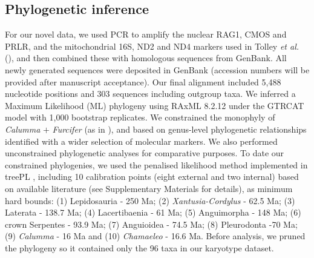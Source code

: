 \documentclass[a4paper, 12pt]{article}
\begin{document}
\subsection{Phylogenetic inference}
For our novel data, we used PCR to amplify the nuclear RAG1, CMOS and PRLR, and the mitochondrial 16S, ND2 and ND4 markers used in Tolley \textit{et al.} (\citeyear{tolley2013large}), and then combined these with homologous sequences from GenBank. 
All newly generated sequences were deposited in GenBank (accession numbers will be provided after manuscript acceptance). 
Our final alignment included 5,488 nucleotide positions and 303 sequences including outgroup taxa. 
We inferred a Maximum Likelihood (ML) phylogeny using RAxML 8.2.12 \citep{stamatakis2014raxml} under the GTRCAT model with 1,000 bootstrap replicates. 
We constrained the monophyly of \textit{Calumma} $+$ \textit{Furcifer} (as in \citealt{tolley2013large}), and based on genus-level phylogenetic relationships identified with a wider selection of molecular markers. 
We also performed unconstrained phylogenetic analyses for comparative purposes. 
To date our constrained phylogenies, we used the penalised likelihood method implemented in treePL \citep{smith2012treepl}, including 10 calibration points (eight external and two internal) based on available literature (see Supplementary Materials for details), as minimum hard bounds: (1) Lepidosauria - 250 Ma; (2) \textit{Xantusia-Cordylus} - 62.5 Ma; (3) Laterata - 138.7 Ma; (4) Lacertibaenia - 61 Ma; (5) Anguimorpha - 148 Ma; (6) crown Serpentes - 93.9 Ma; (7) Anguioidea - 74.5 Ma; (8) Pleurodonta -70 Ma; (9) \textit{Calumma} - 16 Ma and (10) \textit{Chamaeleo} - 16.6 Ma. 
Before analysis, we pruned the phylogeny so it contained only the 96 taxa in our karyotype dataset.
\end{document}

